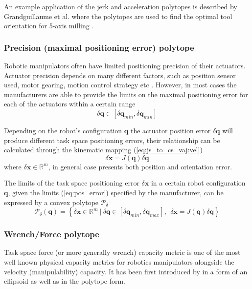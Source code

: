An example application of the jerk and acceleration polytopes is described by Grandguillaume et al. where the polytopes are used to find the optimal tool orientation for 5-axis milling \cite{Grandguillaume2021}.

\subsubsection{Precision (maximal positioning error) polytope }

Robotic manipulators often have limited positioning precision of their actuators. Actuator precision depends on many different factors, such as position sensor used, motor gearing, motion control strategy etc \cite{pholsiri2005real,Finotello1998}. However, in most cases the manufacturers are able to provide the limits on the maximal positioning error for each of the actuators within a certain range
\begin{equation}
    \delta\bm{q} \in [\delta\bm{q}_{min}, \delta\bm{q}_{min}]
    \label{eq:pos_error}
\end{equation}

Depending on the robot's configuration $\bm{q}$ the actuator position error $\delta\bm{q}$ will produce different task space positioning errors, their relationship can be calculated through the kinematic mapping (\ref{eq:js_to_cs_vaj:vel})
\begin{equation}
    \delta\bm{x} = J(\bm{q})\delta \bm{q}
\end{equation}
where $\delta\bm{x}\in\mathbb{R}^m$, in general case presents both position and orientation error.

The limits of the task space positioning error $\delta \bm{x}$ in a certain robot configuration $\bm{q}$, given the limits (\ref{eq:pos_error}) specified by the manufacturer, can be expressed by a convex polytope $\mathcal{P}_\delta$
\begin{equation}
    \mathcal{P}_\delta(\bm{q}) = \left\{ \delta \bm{x} \in \mathbb{R}^m ~|~ \delta  {\bm{q}}\in\left[ \delta {\bm{q}}_{min}, \delta {\bm{q}}_{max} \right], ~~  \delta  {\bm{x}} = J(\bm{q}) \delta {\bm{q}} \right\}
    \label{eq:poly_precision_rob}
\end{equation}

\subsubsection{Wrench/Force polytope}
\label{ch:poly_force}
Task space force (or more generally wrench) capacity metric is one of the most well known physical capacity metrics for robotics manipulators alongside the velocity (manipulability) capacity. It has been first introduced by \citet{chiacchio_evaluation_1996} in a form of an ellipsoid as well as in the polytope form.

